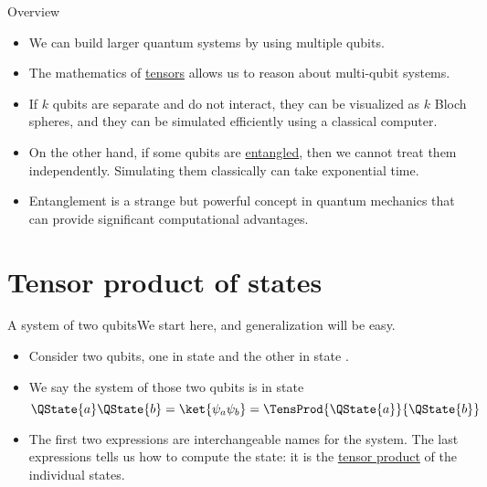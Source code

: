 
\begin{frame}{Overview}

\begin{itemize}
    \item We can build larger quantum systems by using multiple qubits.
    \item The mathematics of \href{https://en.wikipedia.org/wiki/Tensor}{tensors} allows us to reason about multi-qubit systems.
    \item If $k$ qubits are separate and do not interact, they can be visualized as $k$ Bloch spheres, and they can be simulated efficiently using a classical computer.
    \item On the other hand, if some qubits are \href{https://en.wikipedia.org/wiki/Quantum_entanglement}{entangled}, then we cannot treat them independently.  Simulating them classically can take exponential time.
    \item Entanglement is a strange but powerful concept in quantum mechanics that can provide significant computational advantages.
\end{itemize}
    
\end{frame}

\section{Tensor product of states}

\begin{frame}{A system of two qubits}{We start here, and generalization will be easy.}
\begin{itemize}
    \item Consider two qubits, one in state  and the other in state .
    \item We say the system of those two qubits is in state
    \[
       \QState{a}\QState{b} = \ket{\psi_{a}\psi_{b}} = \TensProd{\QState{a}}{\QState{b}}
    \]
    \item The first two expressions are interchangeable names for the system. The last expressions tells us how to compute the state:  it is the \href{https://en.wikipedia.org/wiki/Tensor_product}{tensor product} of the individual states.
\end{itemize}
\end{frame}


